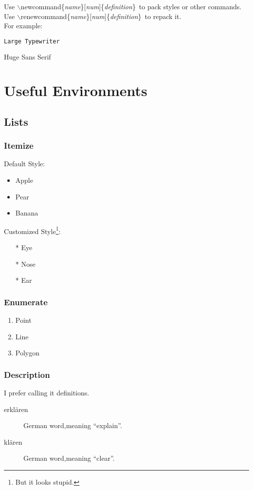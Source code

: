 \documentclass[a4paper]{report}
\begin{document}
Use
$\backslash$newcommand\{\emph{name}\}[\emph{num}]\{\emph{definition}\}\
to pack styles or other commands.\\

Use
$\backslash$renewcommand\{\emph{name}\}[\emph{num}]\{\emph{definition}\}\
to repack it.\\

For example:\\

\newcommand{\Ltt}[1]{\Large{\texttt{#1}}}

\Ltt{Large Typewriter}

\renewcommand{\Ltt}[1]{\Huge{\textsf{#1}}}

\Ltt{Huge Sans Serif}

\normalsize{}
\chapter{Useful Environments}
\section{Lists}
\subsection{Itemize}
Default Style:
\begin{itemize}
\item Apple
\item Pear
\item Banana
\end{itemize}
Customized Style\footnote{But it looks stupid.}:
\begin{itemize}
\item[*] Eye
\item[*] Nose
\item[*] Ear
\end{itemize}

\subsection{Enumerate}
\begin{enumerate}
\item Point
\item Line
\item Polygon
\end{enumerate}

\subsection{Description}
I prefer calling it definitions.
\begin{description}
\item[erkl\" aren]German word,meaning ``explain''.
\item[kl\" aren]German word,meaning ``clear''.
\end{description}
\end{document}
